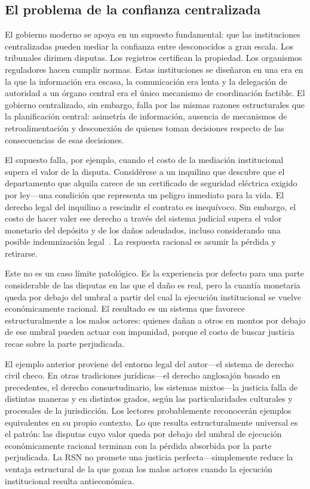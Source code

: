 \documentclass[11pt,a4paper,twocolumn]{article}
\begin{document}
\subsection{El problema de la confianza centralizada}

El gobierno moderno se apoya en un supuesto fundamental: que las instituciones centralizadas pueden mediar la confianza entre desconocidos a gran escala. Los tribunales dirimen disputas. Los registros certifican la propiedad. Los organismos reguladores hacen cumplir normas. Estas instituciones se diseñaron en una era en la que la información era escasa, la comunicación era lenta y la delegación de autoridad a un órgano central era el único mecanismo de coordinación factible. El gobierno centralizado, sin embargo, falla por las mismas razones estructurales que la planificación central: asimetría de información, ausencia de mecanismos de retroalimentación y desconexión de quienes toman decisiones respecto de las consecuencias de esas decisiones.

El supuesto falla, por ejemplo, cuando el costo de la mediación institucional supera el valor de la disputa. Considérese a un inquilino que descubre que el departamento que alquila carece de un certificado de seguridad eléctrica exigido por ley---una condición que representa un peligro inmediato para la vida. El derecho legal del inquilino a rescindir el contrato es inequívoco. Sin embargo, el costo de hacer valer ese derecho a través del sistema judicial supera el valor monetario del depósito y de los daños adeudados, incluso considerando una posible indemnización legal~\cite{czcourtfees}. La respuesta racional es asumir la pérdida y retirarse.

Este no es un caso límite patológico. Es la experiencia por defecto para una parte considerable de las disputas en las que el daño es real, pero la cuantía monetaria queda por debajo del umbral a partir del cual la ejecución institucional se vuelve económicamente racional. El resultado es un sistema que favorece estructuralmente a los malos actores: quienes dañan a otros en montos por debajo de ese umbral pueden actuar con impunidad, porque el costo de buscar justicia recae sobre la parte perjudicada.

El ejemplo anterior proviene del entorno legal del autor---el sistema de derecho civil checo. En otras tradiciones jurídicas---el derecho anglosajón basado en precedentes, el derecho consuetudinario, los sistemas mixtos---la justicia falla de distintas maneras y en distintos grados, según las particularidades culturales y procesales de la jurisdicción. Los lectores probablemente reconocerán ejemplos equivalentes en su propio contexto. Lo que resulta estructuralmente universal es el patrón: las disputas cuyo valor queda por debajo del umbral de ejecución económicamente racional terminan con la pérdida absorbida por la parte perjudicada. La RSN no promete una justicia perfecta---simplemente reduce la ventaja estructural de la que gozan los malos actores cuando la ejecución institucional resulta antieconómica.
\end{document}
